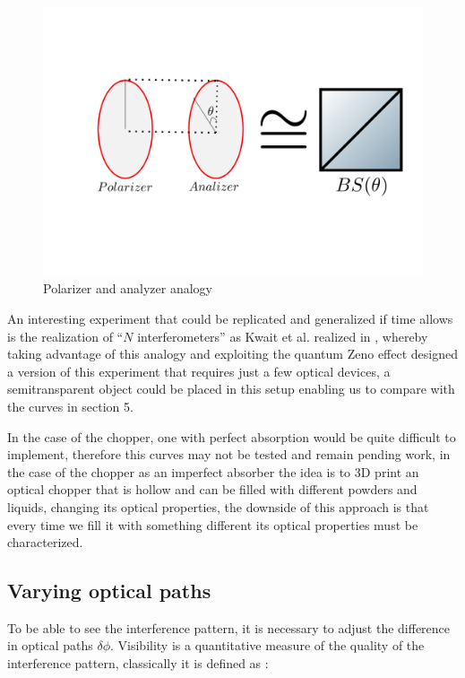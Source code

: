 \documentclass{book}
\begin{document}
\begin{figure}[H]
\centering
\includegraphics[width=\linewidth]{images/polarizeranalogy.png}
\caption{Polarizer and analyzer analogy}
\label{BS and polarizer}
\end{figure}

An interesting experiment that could be replicated and generalized if time allows is the realization of ``$N$ interferometers'' as Kwait et al. realized in \cite{exp}, whereby taking advantage of this analogy and exploiting the quantum Zeno effect \cite{zeno} designed a version of this experiment that requires just a few optical devices, a semitransparent object could be placed in this setup enabling us to compare with the curves in section 5.


In the case of the chopper, one with perfect absorption would be quite difficult to implement, therefore this curves may not be tested and remain pending work, in the case of the chopper as an imperfect absorber the idea is to 3D print an optical chopper that is hollow and can be filled with different powders and liquids, changing its optical properties, the downside of this approach is that every time we fill it with something different its optical properties must be characterized.



\subsection{Varying optical paths}

To be able to see the interference pattern, it is necessary to adjust the difference in optical paths $\delta \phi$. Visibility is a quantitative measure of the quality of the interference pattern, classically it is defined as \cite{hecht}:
\end{document}
